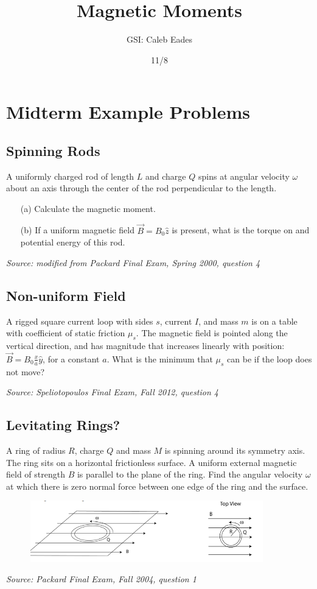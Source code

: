 \documentclass{article}
\begin{document}
\title{Magnetic Moments}
\author{GSI: Caleb Eades}
\date{11/8}
\maketitle

\section{Midterm Example Problems}

\subsection{Spinning Rods}

A uniformly charged rod of length $L$ and charge $Q$ spins at angular velocity $\omega$ about an axis through the center of the rod perpendicular to the length.
\begin{itemize}
	\item[(a)] Calculate the magnetic moment.
	\item[(b)] If a uniform magnetic field $\vec{B}=B_0\hat{z}$ is present, what is the torque on and potential energy of this rod.
\end{itemize}

\textit{Source: modified from Packard Final Exam, Spring 2000, question 4}

\subsection{Non-uniform Field}

A rigged square current loop with sides $s$, current $I$, and mass $m$ is on a table with coefficient of static friction $\mu_s$. The magnetic field is pointed along the vertical direction, and has magnitude that increases linearly with position: $\vec{B}=B_0\frac{x}{a}\hat{y}$, for a constant $a$. What is the minimum that $\mu_s$ can be if the loop does not move?

\textit{Source: Speliotopoulos Final Exam, Fall 2012, question 4}

\subsection{Levitating Rings?}

A ring of radius $R$, charge $Q$ and mass $M$ is spinning around its symmetry axis. The ring sits on a horizontal frictionless surface. A uniform external magnetic field of strength $B$ is parallel to the plane of the ring. Find the angular velocity $\omega$ at which there is zero normal force between one edge of the ring and the surface.

\begin{figure}[h]
	\begin{center}
		\includegraphics[width=0.9\textwidth]{Ring.png}
	\end{center}
\end{figure}

\textit{Source: Packard Final Exam, Fall 2004, question 1}
\end{document}
